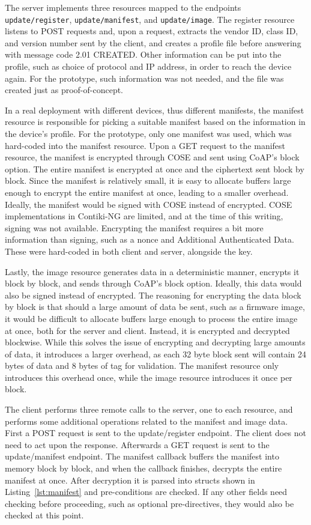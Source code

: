 \documentclass[0-thesis.tex]{subfiles}
\begin{document}
The server implements three resources mapped to the endpoints \texttt{update/register},
\texttt{update/manifest}, and \texttt{update/image}. The register resource listens to POST
requests and, upon a request, extracts the vendor ID, class ID, and version number sent by
the client, and creates a profile file before answering with message code 2.01 CREATED.
Other information can be put into the profile, such as choice of protocol and IP address,
in order to reach the device again. For the prototype, such information was not needed,
and the file was created just as proof-of-concept.

In a real deployment with different devices, thus different manifests, the manifest
resource is responsible for picking a suitable manifest based on the information in the
device's profile. For the prototype, only one manifest was used, which was hard-coded into
the manifest resource. Upon a GET request to the manifest resource, the manifest is
encrypted through COSE and sent using CoAP's block option. The entire manifest is
encrypted at once and the ciphertext sent block by block. Since the manifest is relatively
small, it is easy to allocate buffers large enough to encrypt the entire manifest at once,
leading to a smaller overhead. Ideally, the manifest would be signed with COSE instead of
encrypted. COSE implementations in Contiki-NG are limited, and at the time of this
writing, signing was not available. Encrypting the manifest requires a bit more
information than signing, such as a nonce and Additional Authenticated Data. These were
hard-coded in both client and server, alongside the key.

Lastly, the image resource generates data in a deterministic manner, encrypts it block by
block, and sends through CoAP's block option. Ideally, this data would also be signed
instead of encrypted. The reasoning for encrypting the data block by block is that should
a large amount of data be sent, such as a firmware image, it would be difficult to
allocate buffers large enough to process the entire image at once, both for the server and
client. Instead, it is encrypted and decrypted blockwise. While this solves the issue of
encrypting and decrypting large amounts of data, it introduces a larger overhead, as each
32 byte block sent will contain 24 bytes of data and 8 bytes of tag for validation. The
manifest resource only introduces this overhead once, while the image resource introduces
it once per block.

The client performs three remote calls to the server, one to each resource, and performs
some additional operations related to the manifest and image data. First a POST request is
sent to the update/register endpoint. The client does not need to act upon the response.
Afterwards a GET request is sent to the update/manifest endpoint. The manifest callback
buffers the manifest into memory block by block, and when the callback finishes, decrypts
the entire manifest at once. After decryption it is parsed into structs shown in
Listing~\ref{lst:manifest} and pre-conditions are checked. If any other fields need
checking before proceeding, such as optional pre-directives, they would also be checked at
this point. 
\end{document}
